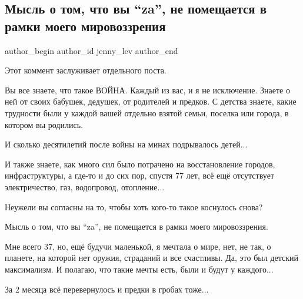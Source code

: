  
 
 
 
 
 
\subsection{Мысль о том, что вы \enquote{za}, не помещается в рамки моего мировоззрения}
\label{sec:23_04_2022.fb.jenny_lev.2.za}
 
\ifcmt
 author_begin
   author_id jenny_lev
 author_end
\fi

Этот коммент заслуживает отдельного поста.

Вы все знаете, что такое ВОЙНА. Каждый из вас, и я не исключение. Знаете о ней
от своих бабушек, дедушек, от родителей и предков. С детства знаете, какие
трудности были у каждой вашей отдельно взятой семьи, поселка или города, в
котором вы родились.

И сколько десятилетий после войны на минах подрывалось детей...

И также знаете, как много сил было потрачено на восстановление городов,
инфраструктуры, а где-то и до сих пор, спустя 77 лет, всё ещё отсутствует
электричество, газ, водопровод, отопление...

Неужели вы согласны на то, чтобы хоть кого-то такое коснулось снова? 

Мысль о том, что вы \enquote{za}, не помещается в рамки моего мировоззрения. 

Мне всего 37, но, ещё будучи маленькой, я мечтала о мире, нет, не так, о
планете, на которой нет оружия, страданий и все счастливы. Да, это был детский
максимализм. И полагаю, что такие мечты есть, были и будут у каждого... 

За 2 месяца всё перевернулось и предки в гробах тоже...

